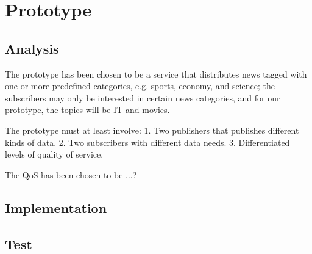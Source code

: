 \chapter{Prototype}
\section{Analysis}
The prototype has been chosen to be a service that distributes news tagged with one or more predefined categories,
e.g. sports, economy, and science; the subscribers may only be interested in certain news
categories, and for our prototype, the topics will be IT and movies.

The prototype must at least involve:
1. Two publishers that publishes different kinds of data.
2. Two subscribers with different data needs.
3. Differentiated levels of quality of service.

The QoS has been chosen to be ...?

\section{Implementation}


\section{Test}
